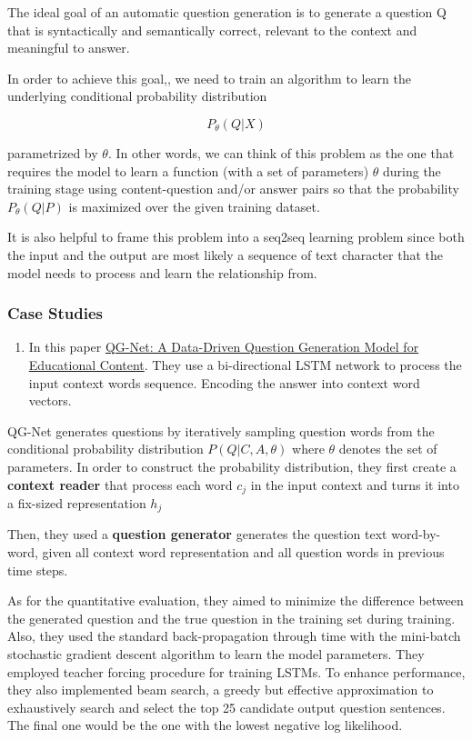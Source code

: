 \documentclass[]{book}
\providecommand{\tightlist}{%
  \setlength{\itemsep}{0pt}\setlength{\parskip}{0pt}}
\theoremstyle{definition}
\theoremstyle{definition}
\theoremstyle{definition}
\theoremstyle{remark}
\begin{document}
The ideal goal of an automatic question generation is to generate a
question Q that is syntactically and semantically correct, relevant to
the context and meaningful to answer.

In order to achieve this goal,, we need to train an algorithm to learn
the underlying conditional probability distribution

\[P_{\theta}(Q|X)\]

parametrized by \(\theta\). In other words, we can think of this problem
as the one that requires the model to learn a function (with a set of
parameters) \(\theta\) during the training stage using content-question
and/or answer pairs so that the probability \(P_{\theta}(Q|P)\) is
maximized over the given training dataset.

It is also helpful to frame this problem into a seq2seq learning problem
since both the input and the output are most likely a sequence of text
character that the model needs to process and learn the relationship
from.

\subsubsection{Case Studies}\label{case-studies}

\begin{enumerate}
\def\labelenumi{\arabic{enumi}.}
\tightlist
\item
  In this paper
  \href{http://www.princeton.edu/~shitingl/papers/18l@s-qgen.pdf}{QG-Net:
  A Data-Driven Question Generation Model for Educational Content}. They
  use a bi-directional LSTM network to process the input context words
  sequence. Encoding the answer into context word vectors.
\end{enumerate}

QG-Net generates questions by iteratively sampling question words from
the conditional probability distribution \(P(Q|C,A,\theta)\) where
\(\theta\) denotes the set of parameters. In order to construct the
probability distribution, they first create a \textbf{context reader}
that process each word \(c_j\) in the input context and turns it into a
fix-sized representation \(h_j\)

Then, they used a \textbf{question generator} generates the question
text word-by-word, given all context word representation and all
question words in previous time steps.

As for the quantitative evaluation, they aimed to minimize the
difference between the generated question and the true question in the
training set during training. Also, they used the standard
back-propagation through time with the mini-batch stochastic gradient
descent algorithm to learn the model parameters. They employed teacher
forcing procedure for training LSTMs. To enhance performance, they also
implemented beam search, a greedy but effective approximation to
exhaustively search and select the top 25 candidate output question
sentences. The final one would be the one with the lowest negative log
likelihood.
\end{document}

